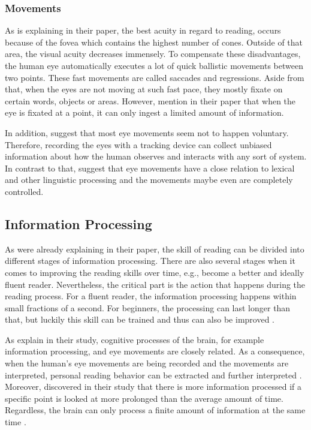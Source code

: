 \subsubsection{Movements}
As \textcite{djamasbi2014eye} is explaining in their paper, the best acuity in regard to reading, occurs because of the fovea which contains the highest number of cones. Outside of that area, the visual acuity decreases immensely. To compensate these disadvantages, the human eye automatically executes a lot of quick ballistic movements between two points. These fast movements are called saccades and regressions.
Aside from that, when the eyes are not moving at such fast pace, they mostly fixate on certain words, objects or areas. However, \textcite{biedert2010eyebook} mention in their paper that when the eye is fixated at a point, it can only ingest a limited amount of information.

In addition, \textcite{bruneau2002eyes} suggest that most eye movements seem not to happen voluntary. Therefore, recording the eyes with a tracking device can collect unbiased information about how the human observes and interacts with any sort of system. In contrast to that, \textcite{clifton2016eye} suggest that eye movements have a close relation to lexical and other linguistic processing and the movements maybe even are completely controlled.

\subsection{Information Processing}
\label{subsection:InformationProcessing}

As \textcite{laberge1974toward} were already explaining in their paper, the skill of reading can be divided into different stages of information processing. There are also several stages when it comes to improving the reading skills over time, e.g., become a better and ideally fluent reader. Nevertheless, the critical part is the action that happens during the reading process. For a fluent reader, the information processing happens within small fractions of a second. For beginners, the processing can last longer than that, but luckily this skill can be trained and thus can also be improved \autocite{laberge1974toward}.

As \textcite{biedert2010eyebook} explain in their study, cognitive processes of the brain, for example information processing, and eye movements are closely related.  As a consequence, when the human's eye movements are being recorded and the movements are interpreted, personal reading behavior can be extracted and further interpreted \autocite{biedert2010eyebook}.\\
Moreover, \textcite{buscher2009you} discovered in their study that there is more information processed if a specific point is looked at more prolonged than the average amount of time. Regardless, the brain can only process a finite amount of information at the same time \autocite{biedert2010eyebook}.

